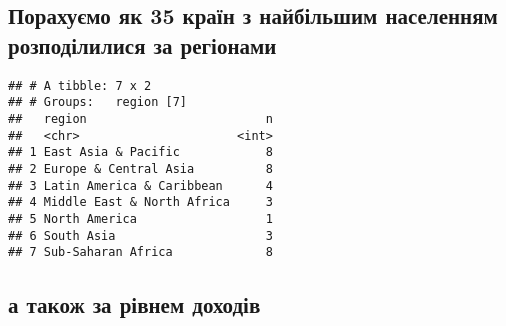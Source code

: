 \documentclass[
]{article}
\newenvironment{Shaded}{\begin{snugshade}}{\end{snugshade}}
\newcommand{\KeywordTok}[1]{\textcolor[rgb]{0.13,0.29,0.53}{\textbf{#1}}}
\newcommand{\NormalTok}[1]{#1}
\newcommand{\OperatorTok}[1]{\textcolor[rgb]{0.81,0.36,0.00}{\textbf{#1}}}
\newcommand{\StringTok}[1]{\textcolor[rgb]{0.31,0.60,0.02}{#1}}
\begin{document}
\hypertarget{ux43fux43eux440ux430ux445ux443ux454ux43cux43e-ux44fux43a-35-ux43aux440ux430ux457ux43d-ux437-ux43dux430ux439ux431ux456ux43bux44cux448ux438ux43c-ux43dux430ux441ux435ux43bux435ux43dux43dux44fux43c-ux440ux43eux437ux43fux43eux434ux456ux43bux438ux43bux438ux441ux44f-ux437ux430-ux440ux435ux433ux456ux43eux43dux430ux43cux438}{%
\subsection{Порахуємо як 35 країн з найбільшим населенням розподілилися
за
регіонами}\label{ux43fux43eux440ux430ux445ux443ux454ux43cux43e-ux44fux43a-35-ux43aux440ux430ux457ux43d-ux437-ux43dux430ux439ux431ux456ux43bux44cux448ux438ux43c-ux43dux430ux441ux435ux43bux435ux43dux43dux44fux43c-ux440ux43eux437ux43fux43eux434ux456ux43bux438ux43bux438ux441ux44f-ux437ux430-ux440ux435ux433ux456ux43eux43dux430ux43cux438}}

\begin{Shaded}
\end{Shaded}

\begin{verbatim}
## # A tibble: 7 x 2
## # Groups:   region [7]
##   region                         n
##   <chr>                      <int>
## 1 East Asia & Pacific            8
## 2 Europe & Central Asia          8
## 3 Latin America & Caribbean      4
## 4 Middle East & North Africa     3
## 5 North America                  1
## 6 South Asia                     3
## 7 Sub-Saharan Africa             8
\end{verbatim}

\hypertarget{ux430-ux442ux430ux43aux43eux436-ux437ux430-ux440ux456ux432ux43dux435ux43c-ux434ux43eux445ux43eux434ux456ux432}{%
\subsection{а також за рівнем
доходів}\label{ux430-ux442ux430ux43aux43eux436-ux437ux430-ux440ux456ux432ux43dux435ux43c-ux434ux43eux445ux43eux434ux456ux432}}

\begin{Shaded}
\end{Shaded}
\end{document}
